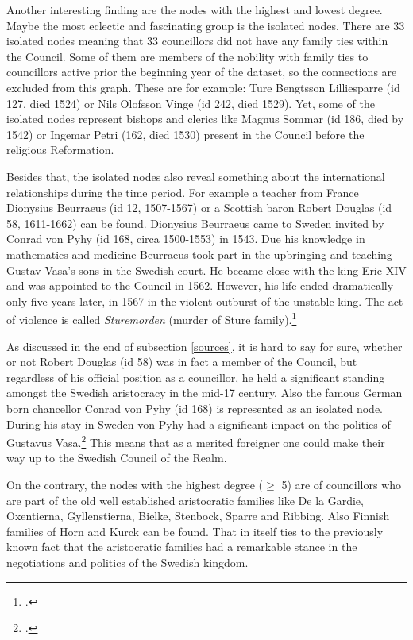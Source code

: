 Another interesting finding are the nodes with the highest and lowest degree. Maybe the most eclectic and fascinating group is the isolated nodes. There are 33 isolated nodes meaning that 33 councillors did not have any family ties within the Council. Some of them are members of the nobility with family ties to councillors active prior the beginning year of the dataset, so the connections are excluded from this graph. These are for example: Ture Bengtsson Lilliesparre (id 127, died 1524) or Nils Olofsson Vinge (id 242, died 1529). Yet, some of the isolated nodes represent bishops and clerics like Magnus Sommar (id 186, died by 1542) or Ingemar Petri (162, died 1530) present in the Council before the religious Reformation. 

Besides that, the isolated nodes also reveal something about the international relationships during the time period. For example a teacher from France Dionysius Beurraeus (id 12, 1507-1567) or a Scottish baron Robert Douglas (id 58, 1611-1662) can be found. Dionysius Beurraeus came to Sweden invited by Conrad von Pyhy (id 168, circa 1500-1553) in 1543. Due his knowledge in mathematics and medicine Beurraeus took part in the upbringing and teaching Gustav Vasa's sons in the Swedish court. He became close with the king Eric XIV and was appointed to the Council in 1562. However, his life ended dramatically only five years later, in 1567 in the violent outburst of the unstable king. The act of violence is called \textit{Sturemorden} (murder of Sture family).\footcite{sbl_DB}   

As discussed in the end of subsection \ref{sources}, it is hard to say for sure, whether or not Robert Douglas (id 58) was in fact a member of the Council, but regardless of his official position as a councillor, he held a significant standing amongst the Swedish aristocracy in the mid-17 century. Also the famous German born chancellor Conrad von Pyhy (id 168) is represented as an isolated node. During his stay in Sweden von Pyhy had a significant impact on the politics of Gustavus Vasa.\footcite[pp. 81-83.]{pSuurvalta} This means that as a merited foreigner one could make their way up to the Swedish Council of the Realm.

On the contrary, the nodes with the highest degree ($\geq$ 5) are of councillors who are part of the old well established aristocratic families like De la Gardie, Oxentierna, Gyllenstierna, Bielke, Stenbock, Sparre and Ribbing. Also Finnish families of Horn and Kurck can be found. That in itself ties to the previously known fact that the aristocratic families had a remarkable stance in the negotiations and politics of the Swedish kingdom.

